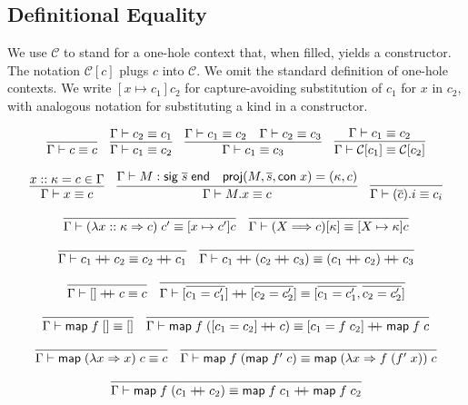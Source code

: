 \documentclass{article}
\newcommand{\mt}[1]{\mathsf{#1}}
\newcommand{\rc}{+ \hspace{-.075in} + \;}
\begin{document}
\subsection{\label{definitional}Definitional Equality}

We use $\mathcal C$ to stand for a one-hole context that, when filled, yields a constructor.  The notation $\mathcal C[c]$ plugs $c$ into $\mathcal C$.  We omit the standard definition of one-hole contexts.  We write $[x \mapsto c_1]c_2$ for capture-avoiding substitution of $c_1$ for $x$ in $c_2$, with analogous notation for substituting a kind in a constructor.

$$\infer{\Gamma \vdash c \equiv c}{}
\quad \infer{\Gamma \vdash c_1 \equiv c_2}{
  \Gamma \vdash c_2 \equiv c_1
}
\quad \infer{\Gamma \vdash c_1 \equiv c_3}{
  \Gamma \vdash c_1 \equiv c_2
  & \Gamma \vdash c_2 \equiv c_3
}
\quad \infer{\Gamma \vdash \mathcal C[c_1] \equiv \mathcal C[c_2]}{
  \Gamma \vdash c_1 \equiv c_2
}$$

$$\infer{\Gamma \vdash x \equiv c}{
  x :: \kappa = c \in \Gamma
}
\quad \infer{\Gamma \vdash M.x \equiv c}{
  \Gamma \vdash M : \mt{sig} \; \overline{s} \; \mt{end}
  & \mt{proj}(M, \overline{s}, \mt{con} \; x) = (\kappa, c)
}
\quad \infer{\Gamma \vdash (\overline c).i \equiv c_i}{}$$

$$\infer{\Gamma \vdash (\lambda x :: \kappa \Rightarrow c) \; c' \equiv [x \mapsto c'] c}{}
\quad \infer{\Gamma \vdash (X \Longrightarrow c) [\kappa] \equiv [X \mapsto \kappa] c}{}$$

$$\infer{\Gamma \vdash c_1 \rc c_2 \equiv c_2 \rc c_1}{}
\quad \infer{\Gamma \vdash c_1 \rc (c_2 \rc c_3) \equiv (c_1 \rc c_2) \rc c_3}{}$$

$$\infer{\Gamma \vdash [] \rc c \equiv c}{}
\quad \infer{\Gamma \vdash [\overline{c_1 = c'_1}] \rc [\overline{c_2 = c'_2}] \equiv [\overline{c_1 = c'_1}, \overline{c_2 = c'_2}]}{}$$

$$\infer{\Gamma \vdash \mt{map} \; f \; [] \equiv []}{}
\quad \infer{\Gamma \vdash \mt{map} \; f \; ([c_1 = c_2] \rc c) \equiv [c_1 = f \; c_2] \rc \mt{map} \; f \; c}{}$$

$$\infer{\Gamma \vdash \mt{map} \; (\lambda x \Rightarrow x) \; c \equiv c}{}
\quad \infer{\Gamma \vdash \mt{map} \; f \; (\mt{map} \; f' \; c)
  \equiv \mt{map} \; (\lambda x \Rightarrow f \; (f' \; x)) \; c}{}$$

$$\infer{\Gamma \vdash \mt{map} \; f \; (c_1 \rc c_2) \equiv \mt{map} \; f \; c_1 \rc \mt{map} \; f \; c_2}{}$$
\end{document}
